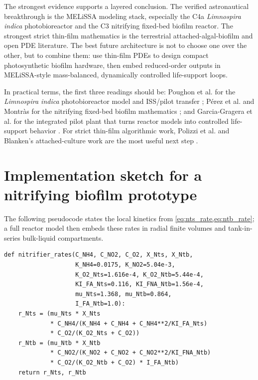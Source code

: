 \documentclass[11pt]{article}
\newcommand{\MEL}{MELiSSA}
\newcommand{\Limno}{\textit{Limnospira indica}}
\begin{document}
The strongest evidence supports a layered conclusion. The verified astronautical breakthrough is the \MEL{} modeling stack, especially the C4a \Limno{} photobioreactor and the C3 nitrifying fixed-bed biofilm reactor. The strongest strict thin-film mathematics is the terrestrial attached-algal-biofilm and open PDE literature. The best future architecture is not to choose one over the other, but to combine them: use thin-film PDEs to design compact photosynthetic biofilm hardware, then embed reduced-order outputs in \MEL{}-style mass-balanced, dynamically controlled life-support loops.

In practical terms, the first three readings should be: Poughon et al. for the \Limno{} photobioreactor model and ISS/pilot transfer \parencite[1--3, 6, 8--9]{poughon2021}; P\'{e}rez et al. and Montr\`as for the nitrifying fixed-bed biofilm mathematics \parencite[2359--2369]{perez2005}\parencite[96--115]{montras2009}; and Garcia-Gragera et al. for the integrated pilot plant that turns reactor models into controlled life-support behavior \parencite[5--6, 11, 13]{garcia2021}. For strict thin-film algorithmic work, Polizzi et al. and Blanken's attached-culture work are the most useful next step \parencite[1, 3--5]{polizzi2022}\parencite[2436--2445]{blanken2014}.

\appendix
\section{Implementation sketch for a nitrifying biofilm prototype}

The following pseudocode states the local kinetics from \cref{eq:nts_rate,eq:ntb_rate}; a full reactor model then embeds these rates in radial finite volumes and tank-in-series bulk-liquid compartments.

\begin{verbatim}
def nitrifier_rates(C_NH4, C_NO2, C_O2, X_Nts, X_Ntb,
                    K_NH4=0.0175, K_NO2=5.04e-3,
                    K_O2_Nts=1.616e-4, K_O2_Ntb=5.44e-4,
                    KI_FA_Nts=0.116, KI_FNA_Ntb=1.56e-4,
                    mu_Nts=1.368, mu_Ntb=0.864,
                    I_FA_Ntb=1.0):
    r_Nts = (mu_Nts * X_Nts
             * C_NH4/(K_NH4 + C_NH4 + C_NH4**2/KI_FA_Nts)
             * C_O2/(K_O2_Nts + C_O2))
    r_Ntb = (mu_Ntb * X_Ntb
             * C_NO2/(K_NO2 + C_NO2 + C_NO2**2/KI_FNA_Ntb)
             * C_O2/(K_O2_Ntb + C_O2) * I_FA_Ntb)
    return r_Nts, r_Ntb
\end{verbatim}
\end{document}
